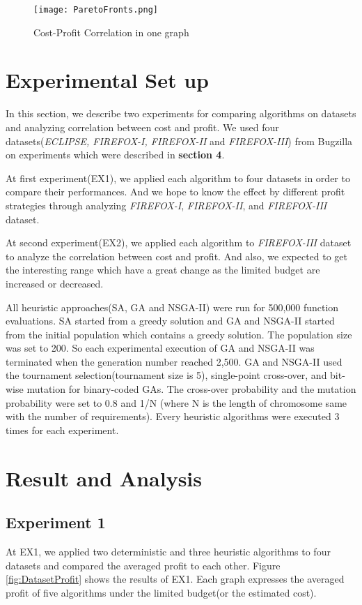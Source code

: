\begin{figure*}[h]
\texttt{[image: ParetoFronts.png]}
\caption{Cost-Profit Correlation in one graph}
\label{fig:paretofronts}
\end{figure*}

\section{Experimental Set up}
In this section, we describe two experiments for comparing algorithms on datasets and analyzing correlation between cost and profit. We used four datasets(\textit{ECLIPSE, FIREFOX-I, FIREFOX-II} and \textit{FIREFOX-III}) from Bugzilla on experiments which were described in \textbf{section 4}.

At first experiment(EX1), we applied each algorithm to four datasets in order to compare their performances. And we hope to know the effect by different profit strategies through analyzing \textit{FIREFOX-I}, \textit{FIREFOX-II}, and \textit{FIREFOX-III} dataset.

At second experiment(EX2), we applied each algorithm to \textit{FIREFOX-III} dataset to analyze the correlation between cost and profit. And also, we expected to get the interesting range which have a great change as the limited budget are increased or decreased.

All heuristic approaches(SA, GA and NSGA-II) were run for 500,000 function evaluations. SA started from a greedy solution and GA and NSGA-II started from the initial population which contains a greedy solution. The population size was set to 200. So each experimental execution of GA and NSGA-II was terminated when the generation number reached 2,500. GA and NSGA-II used the tournament selection(tournament size is 5), single-point cross-over, and bit-wise mutation for binary-coded GAs. The cross-over probability and the mutation probability were set to 0.8 and 1/N (where N is the length of chromosome same with the number of requirements). Every heuristic algorithms were executed 3 times for each experiment.


\section{Result and Analysis}
\subsection{Experiment 1}
At EX1, we applied two deterministic and three heuristic algorithms to four datasets and compared the averaged profit to each other. Figure \ref{fig:DatasetProfit} shows the results of EX1. Each graph expresses the averaged profit of five algorithms under the limited budget(or the estimated cost).

